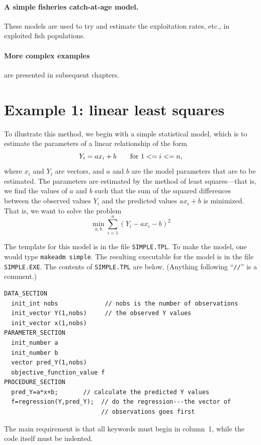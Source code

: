 \documentclass{admbmanual}
\begin{document}
\paragraph{A simple fisheries catch-at-age model.} These models are used to try
and estimate the exploitation rates, etc., in exploited fish populations.

\paragraph{More complex examples} are presented in subsequent chapters.

\section{Example 1: linear least squares}

To illustrate this method, we begin with a simple statistical model, which is to
estimate the parameters of a linear relationship of the form
$$Y_{i} =ax_i+b\qquad \hbox{\rm for}\ 1<=i<=n,$$
where $x_i$ and $Y_i$ are vectors, and $a$ and $b$ are the model parameters
that are to be estimated. The parameters are estimated by the method
of least squares---that is, we find the values of $a$ and $b$ such that
the sum of the squared differences between the observed values
$Y_i$ and the predicted values $ax_i+b$ is minimized. That is,
we want to solve the problem
$$\min_{a,b}\sum_{i=1}^n(Y_i-ax_i-b)^2$$

The template for this model is in the file \texttt{SIMPLE.TPL}. To make the
model, one would type \texttt{makeadm simple}. The resulting executable for the
model is in the file \texttt{SIMPLE.EXE}. The contents of \texttt{SIMPLE.TPL}
are below. (Anything following ``\texttt{//}'' is a comment.)
\begin{lstlisting}
DATA_SECTION
  init_int nobs             // nobs is the number of observations
  init_vector Y(1,nobs)     // the observed Y values
  init_vector x(1,nobs)
PARAMETER_SECTION
  init_number a
  init_number b
  vector pred_Y(1,nobs)
  objective_function_value f
PROCEDURE_SECTION
  pred_Y=a*x+b;       // calculate the predicted Y values
  f=regression(Y,pred_Y);  // do the regression---the vector of
                           // observations goes first
\end{lstlisting}
The main requirement is that all keywords must begin in column~1, while the code
itself must be indented.
\end{document}
